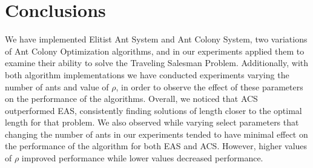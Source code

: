 \documentclass[11pt,twocolumn]{article}
\begin{document}
\section{Conclusions}
We have implemented Elitist Ant System and Ant Colony System, two variations of Ant Colony Optimization algorithms, and in our experiments applied them to examine their ability to solve the Traveling Salesman Problem. Additionally, with both algorithm implementations we have conducted experiments varying the number of ants and value of $\rho$, in order to observe the effect of these parameters on the performance of the algorithms. Overall, we noticed that ACS outperformed EAS, consistently finding solutions of length closer to the optimal length for that problem. We also observed while varying select parameters that changing the number of ants in our experiments tended to have minimal effect on the performance of the algorithm for both EAS and ACS. However, higher values of $\rho$ improved performance while lower values decreased performance.
\end{document}
